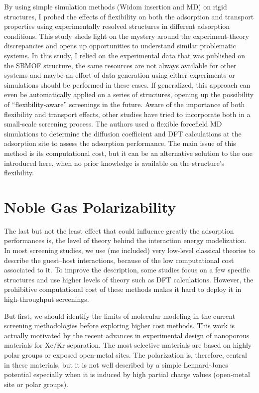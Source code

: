 \documentclass[main]{subfiles}
\begin{document}
By using simple simulation methods (Widom insertion and MD) on rigid structures, I probed the effects of flexibility on both the adsorption and transport properties using experimentally resolved structures in different adsorption conditions. This study sheds light on the mystery around the experiment-theory discrepancies and opens up opportunities to understand similar problematic systems. In this study, I relied on the experimental data that was published on the SBMOF structure, the same resources are not always available for other systems and maybe an effort of data generation using either experiments or simulations should be performed in these cases. If generalized, this approach can even be automatically applied on a series of structures, opening up the possibility of ``flexibility-aware'' screenings in the future. Aware of the importance of both flexibility and transport effects, other studies have tried to incorporate both in a small-scale screening process.\autocite{Stanton_2022} The authors used a flexible forcefield MD simulations to determine the diffusion coefficient and DFT calculations at the adsorption site to assess the adsorption performance. The main issue of this method is its computational cost, but it can be an alternative solution to the one introduced here, when no prior knowledge is available on the structure’s flexibility. 

\section{Noble Gas Polarizability}

The last but not the least effect that could influence greatly the adsorption performances is, the level of theory behind the interaction energy modelization. In most screening studies, we use (me included) very low-level classical theories to describe the guest--host interactions, because of the low computational cost associated to it. To improve the description, some studies focus on a few specific structures and use higher levels of theory such as DFT calculations. However, the prohibitive computational cost of these methods makes it hard to deploy it in high-throughput screenings. 

But first, we should identify the limits of molecular modeling in the current screening methodologies before exploring higher cost methods. This work is actually motivated by the recent advances in experimental design of nanoporous materials for Xe/Kr separation. The most selective materials are based on highly polar groups or exposed open-metal sites.\autocite{Li_2019,Pei_2022} The polarization is, therefore, central in these materials, but it is not well described by a simple Lennard-Jones potential especially when it is induced by high partial charge values (open-metal site or polar groups). 
\end{document}
